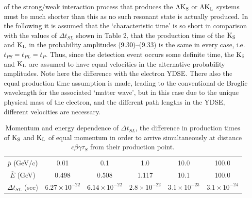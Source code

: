 \documentclass [12pt]{article}
\begin{document}
{   of the strong/weak interaction process that produces the $\Lambda {\rm K_S}$ or $\Lambda {\rm K_L}$
    systems must be much shorter than this as no such resonant state is actually produced. In the following 
   it is assumed that the `characteristic time' is so short in comparison with the values of $\Delta t_{SL}$
   shown in Table 2, that the production time of the ${\rm K_S}$ and ${\rm K_L}$ in the probability amplitudes
   (9.30)--(9.33) is the same in every case, i.e. $t_{PS} = t_{PL} = t_P$. Thus, since the detection
   event occurs some definite time, the ${\rm K_S}$ and ${\rm K_L}$ are assumed to have equal velocities
   in the alternative probability amplitudes. Note here the
   difference with the electron YDSE. There also the equal production time assumption is made, leading
   to the conventional de Broglie wavelength for the associated `matter wave', but in this case due to the 
   unique physical mass of the electron, and the different path lengths in the YDSE, different velocities are necessary.
  
    \begin{table}
   \begin{center}
   \begin{tabular}{|c|c c c c c |} \hline  
     $\overline{p}$ (GeV/c)   & 0.01  & 0.1  &  1.0 & 10.0 & 100.0 \\
    $\overline{E}$ (GeV)   & 0.498  & 0.508 &  1.117 & 10.1 & 100.0 \\
    $\Delta t_{SL}$ (sec) & $6.27 \times 10^{-22}$  & $6.14 \times 10^{-22}$  & $2.8 \times 10^{-22}$ &  $3.1 \times 10^{-23}$
   & $3.1 \times 10^{-24}$   \\             
  \hline
  \end{tabular}
   \caption[] { Momentum and energy dependence of $\Delta t_{SL}$,
  the difference in production times of ${\rm K_S}$ and ${\rm K_L}$ of
   equal momentum in order
 to arrive simultaneously at distance  $c \beta \gamma \tau_S$  from their
   production point.} 
  \end{center}
  \end{table}  
   
}
\end{document}
